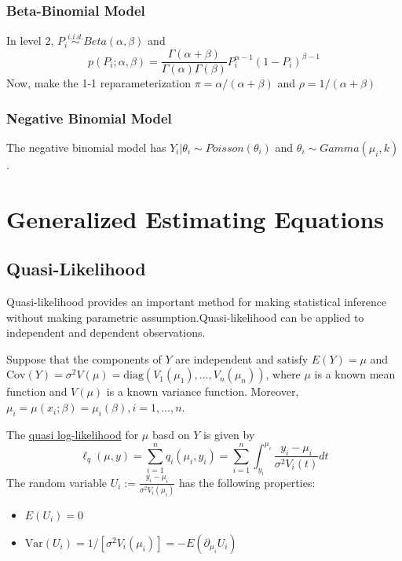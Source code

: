 \documentclass[12pt]{article}
\newcommand{\Var}{\mathrm{Var}}
\newcommand{\Cov}{\mathrm{Cov}}
\newcommand{\sumn}{\sum_{i=1}^n}
\newcommand{\diag}{\text{diag}}
\numberwithin{equation}{section}
\begin{document}
\subsubsection{Beta-Binomial Model}
In level 2, $P_i \stackrel{i.i.d.}{\sim} Beta(\alpha, \beta)$ and
\begin{equation*}
  p(P_i; \alpha, \beta) = \frac{\Gamma(\alpha + \beta)}{\Gamma(\alpha) \Gamma(\beta)} P_i^{\alpha - 1} (1 - P_i)^{\beta - 1}
\end{equation*}
Now, make the 1-1 reparameterization $\pi = \alpha / (\alpha + \beta)$ and $\rho = 1 / (\alpha + \beta)$


\subsubsection{Negative Binomial Model}
The negative binomial model has $Y_i | \theta_i \sim Poisson(\theta_i)$ and $\theta_i \sim Gamma(\mu_i, k)$.

\section{Generalized Estimating Equations}

\subsection{Quasi-Likelihood}
Quasi-likelihood provides an important method for making
statistical inference without making parametric assumption.Quasi-likelihood can be applied to independent and dependent
observations.

Suppose that the components of $Y$ are independent and satisfy 
$E(Y) = \mu$ and 
$\Cov(Y) = \sigma^2 V(\mu) = \diag(V_1(\mu_1), \ldots, V_n(\mu_n))$, where $\mu$ is a known mean function and $V(\mu)$ is a known variance function. Moreover, 
$\mu_i = \mu(x_i; \beta) = \mu_i(\beta), i = 1, \ldots, n$.

The \underline{quasi log-likelihood} for $\mu$ basd on $Y$ is given by
\begin{equation*}
  \ell_{q}(\mu, y) = \sumn q_i(\mu_i, y_i) 
   = \sumn \int_{y_i}^{\mu_i} \frac{y_i - \mu_i}{\sigma^2 V_i(t)} dt
\end{equation*}
%
The random variable $U_i := \frac{y_i - \mu_i}{\sigma^2 V_i(\mu_i)}$ has the following properties:
\begin{itemize}
  \item $E(U_i) = 0$
  \item $\Var(U_i) = 1 / [\sigma^2 V_i(\mu_i)] = -E(\partial_{\mu_i} U_i)$
\end{itemize}
\end{document}
